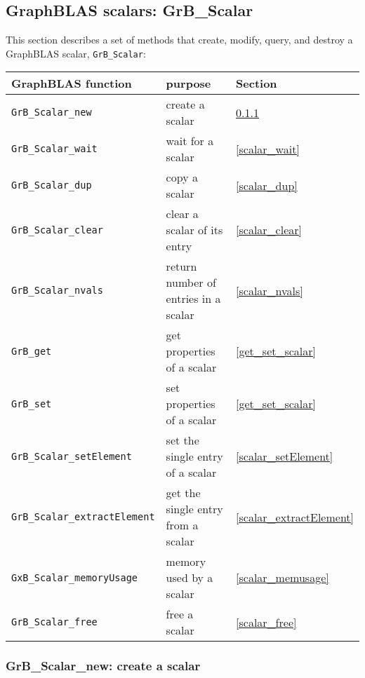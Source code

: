 \documentclass[12pt]{article}
\begin{document}
\newpage
\subsection{GraphBLAS scalars: {\sf GrB\_Scalar}} %
\label{scalar}

This section describes a set of methods that create, modify, query,
and destroy a GraphBLAS scalar, \verb'GrB_Scalar':

\vspace{0.2in}
{\footnotesize
\begin{tabular}{lll}
\hline
GraphBLAS function   & purpose                                      & Section \\
\hline
\verb'GrB_Scalar_new'            & create a scalar                      & \ref{scalar_new} \\
\verb'GrB_Scalar_wait'           & wait for a scalar                    & \ref{scalar_wait} \\
\verb'GrB_Scalar_dup'            & copy a scalar                        & \ref{scalar_dup} \\
\verb'GrB_Scalar_clear'          & clear a scalar of its entry          & \ref{scalar_clear} \\
\verb'GrB_Scalar_nvals'          & return number of entries in a scalar & \ref{scalar_nvals}  \\
\verb'GrB_get'  & get properties of a scalar       & \ref{get_set_scalar} \\
\verb'GrB_set'  & set properties of a scalar       & \ref{get_set_scalar} \\
\verb'GrB_Scalar_setElement'     & set the single entry of a scalar     & \ref{scalar_setElement} \\
\verb'GrB_Scalar_extractElement' & get the single entry from a scalar   & \ref{scalar_extractElement} \\
\verb'GxB_Scalar_memoryUsage'    & memory used by a scalar              & \ref{scalar_memusage} \\
\verb'GrB_Scalar_free'           & free a scalar                        & \ref{scalar_free} \\
\hline
\end{tabular}
}

\subsubsection{{\sf GrB\_Scalar\_new:} create a scalar}
\label{scalar_new}
\end{document}
